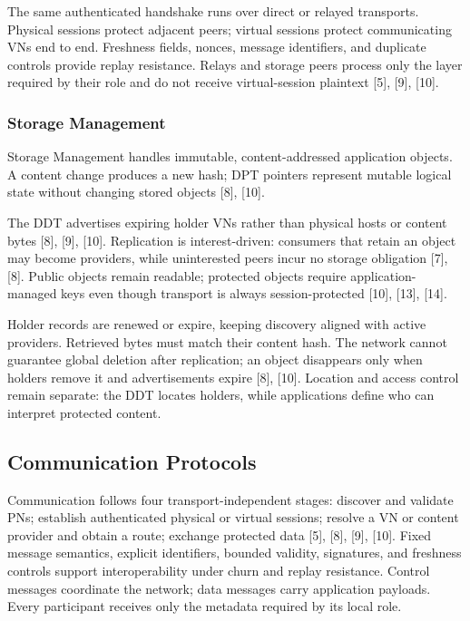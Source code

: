 \documentclass[12pt,a4paper]{article}
\begin{document}
\thesiscryptographicflowtikz

The same authenticated handshake runs over direct or relayed transports. Physical sessions protect adjacent peers; virtual sessions protect communicating VNs end to end. Freshness fields, nonces, message identifiers, and duplicate controls provide replay resistance. Relays and storage peers process only the layer required by their role and do not receive virtual-session plaintext [5], [9], [10].

\subsubsection{Storage Management}

Storage Management handles immutable, content-addressed application objects. A content change produces a new hash; DPT pointers represent mutable logical state without changing stored objects [8], [10].


\thesisddttikz


The DDT advertises expiring holder VNs rather than physical hosts or content bytes [8], [9], [10]. Replication is interest-driven: consumers that retain an object may become providers, while uninterested peers incur no storage obligation [7], [8]. Public objects remain readable; protected objects require application-managed keys even though transport is always session-protected [10], [13], [14].

\thesisephemeraltikz

Holder records are renewed or expire, keeping discovery aligned with active providers. Retrieved bytes must match their content hash. The network cannot guarantee global deletion after replication; an object disappears only when holders remove it and advertisements expire [8], [10]. Location and access control remain separate: the DDT locates holders, while applications define who can interpret protected content.

\subsection{Communication Protocols}

Communication follows four transport-independent stages: discover and validate PNs; establish authenticated physical or virtual sessions; resolve a VN or content provider and obtain a route; exchange protected data [5], [8], [9], [10]. Fixed message semantics, explicit identifiers, bounded validity, signatures, and freshness controls support interoperability under churn and replay resistance. Control messages coordinate the network; data messages carry application payloads. Every participant receives only the metadata required by its local role.
\end{document}
